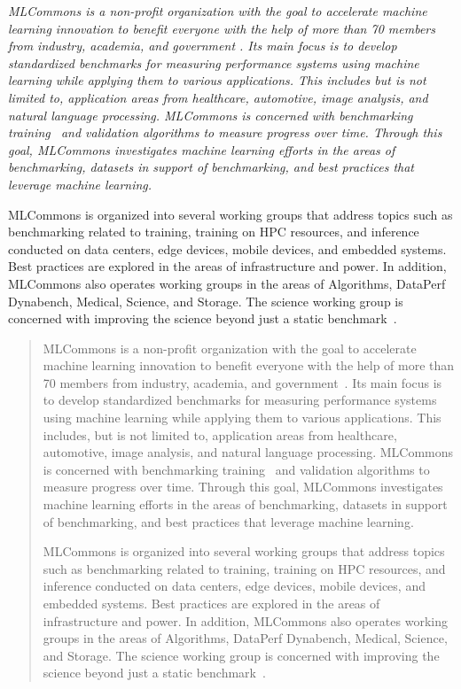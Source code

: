 \documentclass[utf8]{FrontiersinVancouver} %
\newcommand{\REPLACE}[2]{{\color{red}\it #1} \begin{quote}{\color{blue}#2}\end{quote}}
\begin{document}
\REPLACE{
MLCommons is a non-profit organization with the goal to accelerate
machine learning innovation to benefit everyone with the help of more
than 70 members from industry, academia, and government
\citep{www-mlcommons}. Its main focus is to develop standardized
benchmarks for measuring performance systems using machine learning
while applying them to various applications. This includes but is not
limited to, application areas from healthcare, automotive, image
analysis, and natural language processing. MLCommons is concerned with
benchmarking training~\citep{mlperf-training} and validation
algorithms to measure progress over time. Through this goal, MLCommons
investigates machine learning efforts in the areas of benchmarking,
datasets in support of benchmarking, and best practices that leverage
machine learning.

MLCommons is organized into several working groups that address topics
such as benchmarking related to training, training on HPC resources,
and inference conducted on data centers, edge devices, mobile devices,
and embedded systems. Best practices are explored in the areas of
infrastructure and power. In addition, MLCommons also operates working
groups in the areas of Algorithms, DataPerf Dynabench, Medical,
Science, and Storage. The science working group is concerned with
improving the science beyond just a static
benchmark~\citep{las-22-mlcommons-science}.
}{
MLCommons is a non-profit organization with the goal to
accelerate machine learning innovation to benefit everyone with the
help of more than 70 members from industry, academia, and
government~\citep{www-mlcommons}. Its main focus is to develop standardized
benchmarks for measuring performance systems using machine
learning while applying them to various applications. This includes,
but is not limited to, application areas from healthcare, automotive,
image analysis, and natural language processing. MLCommons is
concerned with benchmarking training~\citep{mlperf-training} and
validation algorithms to measure progress over time. Through this goal,
MLCommons investigates machine learning efforts in the areas of
benchmarking, datasets in support of benchmarking, and best practices
that leverage machine learning.

MLCommons is organized into several working groups that address topics
such as benchmarking related to training, training on HPC resources,
and inference conducted on data centers, edge devices, mobile devices, and
embedded systems. Best practices are explored in the areas of
infrastructure and power. In addition, MLCommons also operates
working groups in the areas of Algorithms, DataPerf Dynabench,
Medical, Science, and Storage. The science working group is concerned
with improving the science beyond just a static
benchmark~\citep{las-22-mlcommons-science}.
}
\end{document}
